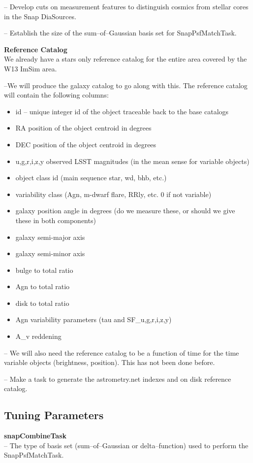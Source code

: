 \documentclass[12pt]{article}
\begin{document}
-- Develop cuts on measurement features to distinguish cosmics from
stellar cores in the Snap DiaSources.

-- Establish the size of the sum--of--Gaussian basis set for SnapPsfMatchTask.

{\bf Reference Catalog}\\
We already have a stars only reference catalog for the entire area
covered by the W13 ImSim area.  

--We will produce the galaxy catalog to
go along with this.  The reference catalog will contain the following
columns:
\begin{itemize}
\item id -- unique integer id of the object traceable back to the base catalogs
\item RA position of the object centroid in degrees
\item DEC position of the object centroid in degrees
\item {u,g,r,i,z,y} observed LSST magnitudes (in the mean sense for variable objects)
\item object class id (main sequence star, wd, bhb, etc.)
\item variability class (Agn, m-dwarf flare, RRly, etc. 0 if not variable)
\item galaxy position angle in degrees (do we measure these, or should we give these in both components)
\item galaxy semi-major axis 
\item galaxy semi-minor axis
\item bulge to total ratio
\item Agn to total ratio
\item disk to total ratio
\item Agn variability parameters (tau and SF\_{u,g,r,i,z,y})
\item A\_v reddening 
\end{itemize}

-- We will also need the reference catalog to be a function of time for
the time variable objects (brightness, position).  This has not been
done before.

-- Make a task to generate the astrometry.net indexes and on disk reference catalog.

\subsection{Tuning Parameters}
{\bf snapCombineTask}\\
-- The type of basis set (sum--of--Gaussian or delta--function) used
to perform the SnapPsfMatchTask.
\end{document}
